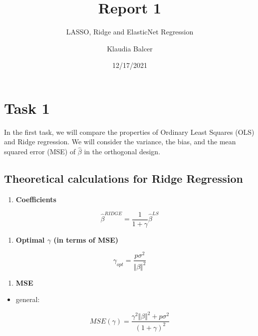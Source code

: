 \documentclass[
]{article}
\title{Report 1}
\subtitle{LASSO, Ridge and ElasticNet Regression}
\author{Klaudia Balcer}
\date{12/17/2021}
\providecommand{\tightlist}{%
  \setlength{\itemsep}{0pt}\setlength{\parskip}{0pt}}
\begin{document}
\maketitle

{
\setcounter{tocdepth}{2}
\tableofcontents
}
\newpage

\hypertarget{task-1}{%
\section{Task 1}\label{task-1}}

In the first task, we will compare the properties of Ordinary Least
Squares (OLS) and Ridge regression. We will consider the variance, the
bias, and the mean squared error (MSE) of \(\hat \beta\) in the
orthogonal design.

\hypertarget{theoretical-calculations-for-ridge-regression}{%
\subsection{Theoretical calculations for Ridge
Regression}\label{theoretical-calculations-for-ridge-regression}}

\begin{enumerate}
\def\labelenumi{\arabic{enumi}.}
\tightlist
\item
  \textbf{Coefficients}
\end{enumerate}

\[\hat \beta ^{RIDGE} = \frac {1}{1 + \gamma} \hat \beta ^{LS}\]

\begin{enumerate}
\def\labelenumi{\arabic{enumi}.}
\setcounter{enumi}{1}
\tightlist
\item
  \textbf{Optimal \(\gamma\) (in terms of MSE)}
\end{enumerate}

\[\gamma_{opt} = \frac {p\sigma^2} {\Vert\beta\Vert^2}\]

\begin{enumerate}
\def\labelenumi{\arabic{enumi}.}
\setcounter{enumi}{2}
\tightlist
\item
  \textbf{MSE}
\end{enumerate}

\begin{itemize}
\tightlist
\item
  general:
\end{itemize}

\[MSE(\gamma) = \frac {\gamma^2\Vert\beta\Vert^2 + p\sigma^2} {(1 + \gamma)^2}\]
\end{document}
